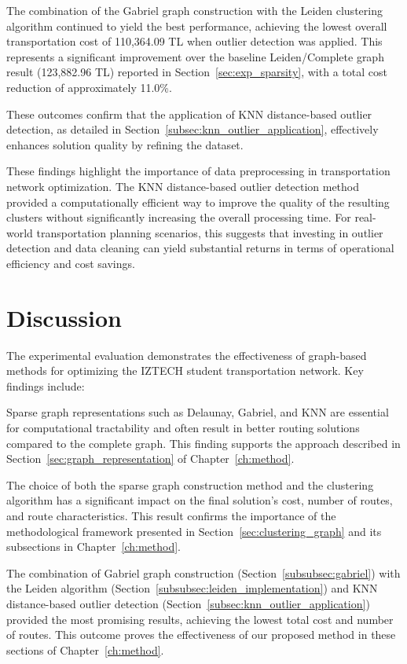 The combination of the Gabriel graph construction with the Leiden clustering algorithm continued to yield the best performance, achieving the lowest overall transportation cost of 110,364.09 TL when outlier detection was applied. This represents a significant improvement over the baseline Leiden/Complete graph result (123,882.96 TL) reported in Section~\ref{sec:exp_sparsity}, with a total cost reduction of approximately 11.0\%.

These outcomes confirm that the application of KNN distance-based outlier detection, as detailed in Section~\ref{subsec:knn_outlier_application}, effectively enhances solution quality by refining the dataset.

These findings highlight the importance of data preprocessing in transportation network optimization. The KNN distance-based outlier detection method provided a computationally efficient way to improve the quality of the resulting clusters without significantly increasing the overall processing time. For real-world transportation planning scenarios, this suggests that investing in outlier detection and data cleaning can yield substantial returns in terms of operational efficiency and cost savings.

\section{Discussion}
\label{sec:discussion}

The experimental evaluation demonstrates the effectiveness of graph-based methods for optimizing the IZTECH student transportation network. Key findings include:

Sparse graph representations such as Delaunay, Gabriel, and KNN are essential for computational tractability and often result in better routing solutions compared to the complete graph. This finding supports the approach described in Section~\ref{sec:graph_representation} of Chapter~\ref{ch:method}.

The choice of both the sparse graph construction method and the clustering algorithm has a significant impact on the final solution's cost, number of routes, and route characteristics. This result confirms the importance of the methodological framework presented in Section~\ref{sec:clustering_graph} and its subsections in Chapter~\ref{ch:method}.

The combination of Gabriel graph construction (Section~\ref{subsubsec:gabriel}) with the Leiden algorithm (Section~\ref{subsubsec:leiden_implementation}) and KNN distance-based outlier detection (Section~\ref{subsec:knn_outlier_application}) provided the most promising results, achieving the lowest total cost and number of routes. This outcome proves the effectiveness of our proposed method in these sections of Chapter~\ref{ch:method}.

